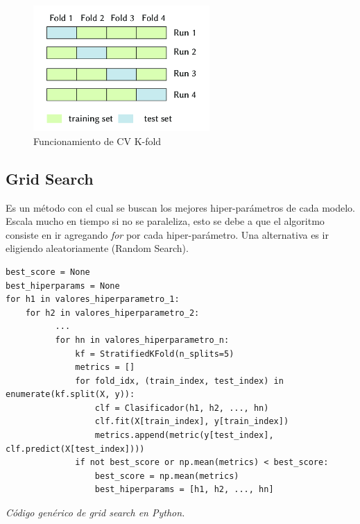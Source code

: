\documentclass[titlepage,a4paper]{article}
\begin{document}
\begin{figure}[!htb]
    \centering
    \includegraphics[width=0.6\textwidth]{imagenesResumen/CVKFold.png}
    \caption{Funcionamiento de CV K-fold}
\end{figure}


\newpage

\subsection{Grid Search}

Es un método con el cual se buscan los mejores hiper-parámetros de cada modelo. Escala mucho en tiempo si no se paraleliza, esto se debe a que el algoritmo consiste en ir agregando \textit{for} por cada hiper-parámetro. Una alternativa es ir eligiendo aleatoriamente (Random Search).

\begin{verbatim}
best_score = None
best_hiperparams = None
for h1 in valores_hiperparametro_1:
    for h2 in valores_hiperparametro_2:
          ...
          for hn in valores_hiperparametro_n:
              kf = StratifiedKFold(n_splits=5)
              metrics = []
              for fold_idx, (train_index, test_index) in enumerate(kf.split(X, y)):
                  clf = Clasificador(h1, h2, ..., hn)
                  clf.fit(X[train_index], y[train_index])
                  metrics.append(metric(y[test_index], clf.predict(X[test_index])))
              if not best_score or np.mean(metrics) < best_score:
                  best_score = np.mean(metrics)
                  best_hiperparams = [h1, h2, ..., hn]
\end{verbatim}
\begin{center}
   \textit{Código genérico de grid search en Python.}
\end{center}
\end{document}
